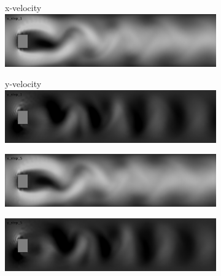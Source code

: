 \documentclass{llncs}
\begin{document}
\begin{figure}[H]
  \vspace*{-4.5cm}
  \begin{subfigure}{.5\textwidth}
    \centering
    \large{x-velocity}
    \includegraphics[width=1\linewidth]{imgs/sims/constant/x_step_1}
  \end{subfigure}
  \begin{subfigure}{.5\textwidth}
    \centering
    \large{y-velocity}
    \includegraphics[width=1\linewidth]{imgs/sims/constant/y_step_1}
  \end{subfigure}

  \begin{subfigure}{.5\textwidth}
    \centering
    \includegraphics[width=1\linewidth]{imgs/sims/constant/x_step_5}
  \end{subfigure}
  \begin{subfigure}{.5\textwidth}
    \centering
    \includegraphics[width=1\linewidth]{imgs/sims/constant/y_step_5}
  \end{subfigure}


\end{figure}
\end{document}

